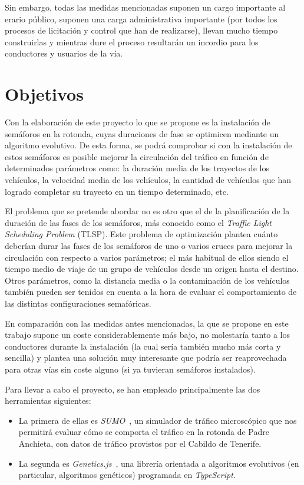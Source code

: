 Sin embargo, todas las medidas mencionadas suponen un cargo importante al erario público, suponen una carga administrativa importante (por todos los procesos de licitación y control que han de realizarse), llevan mucho tiempo construirlas y mientras dure el proceso resultarán un incordio para los conductores y usuarios de la vía.


\section{Objetivos}

Con la elaboración de este proyecto lo que se propone es la instalación de semáforos en la rotonda, cuyas duraciones de fase se optimicen mediante un algoritmo evolutivo. De esta forma, se podrá comprobar si con la instalación de estos semáforos es posible mejorar la circulación del tráfico en función de determinados parámetros como: la duración media de los trayectos de los vehículos, la velocidad media de los vehículos, la cantidad de vehículos que han logrado completar su trayecto en
un tiempo determinado, etc.

El problema que se pretende abordar no es otro que el de la planificación de la duración de las fases de los semáforos, más conocido como el \textit{Traffic Light Scheduling Problem} (TLSP). Este problema de optimización plantea cuánto deberían durar las fases de los semáforos de uno o varios cruces para mejorar la circulación con respecto a varios parámetros; el más habitual de ellos siendo el tiempo medio de viaje de un grupo de vehículos desde un origen hasta el destino. Otros parámetros, como la distancia media o la contaminación de los vehículos también pueden ser tenidos en cuenta a la hora de evaluar el comportamiento de las distintas configuraciones semafóricas.

En comparación con las medidas antes mencionadas, la que se propone en este trabajo supone un coste considerablemente más bajo, no molestaría tanto a los conductores durante la instalación (la cual sería también mucho más corta y sencilla) y plantea una solución muy interesante que podría ser reaprovechada para otras vías sin coste alguno (si ya tuvieran semáforos instalados).

Para llevar a cabo el proyecto, se han empleado principalmente las dos herramientas siguientes:

\begin{itemize}
    \item La primera de ellas es \textit{SUMO}~\cite{lopez_microscopic_2018}, un simulador de tráfico microscópico que nos permitirá evaluar cómo se comporta el tráfico en la rotonda de Padre Anchieta, con datos de tráfico provistos por el Cabildo de Tenerife.
    \item La segunda es \textit{Genetics.js}~\cite{abrante_dorta_framework_2019}, una librería orientada a algoritmos evolutivos (en particular, algoritmos genéticos) programada en \textit{TypeScript}.
\end{itemize}


